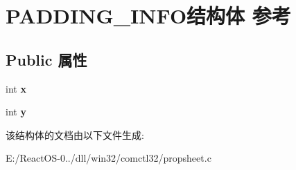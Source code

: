 \hypertarget{struct_p_a_d_d_i_n_g___i_n_f_o}{}\section{P\+A\+D\+D\+I\+N\+G\+\_\+\+I\+N\+F\+O结构体 参考}
\label{struct_p_a_d_d_i_n_g___i_n_f_o}
\subsection*{Public 属性}
\begin{DoxyCompactItemize}
\item 
\mbox{\label{struct_p_a_d_d_i_n_g___i_n_f_o_aff141286de7c16ed3991efe5ef485350}} 
int {\bfseries x}
\item 
\mbox{\label{struct_p_a_d_d_i_n_g___i_n_f_o_a78dde5d3a4372414db12300a232b3d14}} 
int {\bfseries y}
\end{DoxyCompactItemize}


该结构体的文档由以下文件生成\+:\begin{DoxyCompactItemize}
\item 
E\+:/\+React\+O\+S-\/0../dll/win32/comctl32/propsheet.\+c\end{DoxyCompactItemize}
